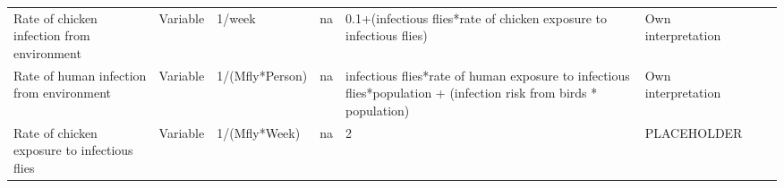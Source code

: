 \begin{landscape}
\begin{longtable}[c]{m{10em}lllm{15em}lll}
Rate of chicken infection from environment    & Variable & 1/week                   & na                        & 0.1+(infectious flies*rate of chicken exposure to infectious flies)                                                                                                                                                                                                                      & Own interpretation                                                                                                                                                                           &                                                                                                                                                                                                                                       \\
Rate of human infection from environment      & Variable & 1/(Mfly*Person)          & na                        & infectious flies*rate of human exposure to infectious flies*population + (infection risk from birds * population)                                                                                                                                                                        & Own interpretation                                                                                                                                                                           &                                                                                                                                                                                                                                       \\
Rate of chicken exposure to infectious flies  & Variable & 1/(Mfly*Week)            & na                        & 2                                                                                                                                                                                                                                                                                        & PLACEHOLDER                                                                                                                                                                                  &                                                                                                                                                                                                                                       \\

\end{longtable}
\end{landscape}
